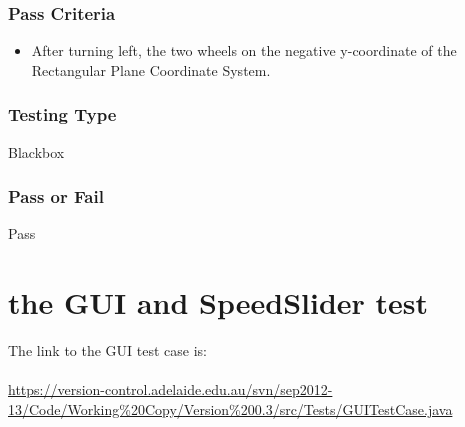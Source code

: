 \documentclass[11pt, a4paper]{report}
\begin{document}
\subsection{Pass Criteria}
\begin{itemize}
\item After turning left, the two wheels on the negative y-coordinate of the Rectangular Plane Coordinate System.
\end{itemize}   
\subsection{Testing Type}
Blackbox
\subsection{Pass or Fail}
Pass
\newpage
\appendix
\chapter{the GUI and SpeedSlider test}
The link to the GUI test case is: \\ \\
\url{https://version-control.adelaide.edu.au/svn/sep2012-13/Code/Working%20Copy/Version%200.3/src/Tests/GUITestCase.java}
\end{document}
